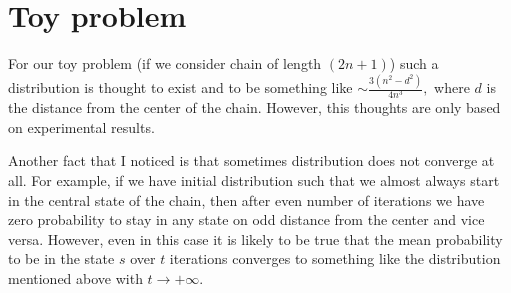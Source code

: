 \documentclass{article}
\begin{document}
\section{Toy problem}

For our toy problem (if we consider chain of length $(2n + 1)$) such a distribution is thought to exist and to be something like $\sim \frac{3(n^2 - d^2)}{4n^3},$ where $d$ is the distance from the center of the chain. However, this thoughts are only based on experimental results.

Another fact that I noticed is that sometimes distribution does not converge at all. For example, if we have initial distribution such that we almost always start in the central state of the chain, then after even number of iterations we have zero probability to stay in any state on odd distance from the center and vice versa. However, even in this case it is likely to be true that the mean probability to be in the state $s$ over $t$ iterations converges to something like the distribution mentioned above with $t \to +\infty.$
\end{document}
